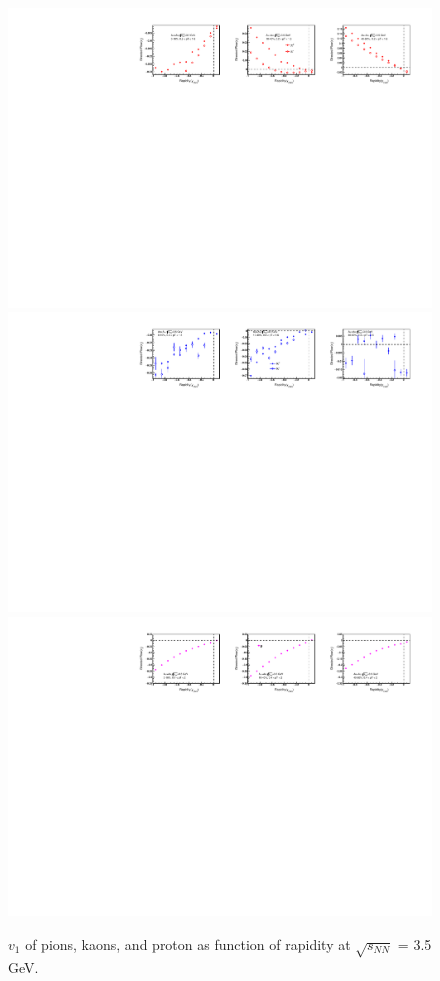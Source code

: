 \begin{figure}[hbt!]
\centering
\includegraphics[width=0.85\linewidth]{figures/chapter03/3p5gev_pion_v1VSy.pdf}
\includegraphics[width=0.85\linewidth]{figures/chapter03/3p5gev_kaon_v1VSy.pdf}
\includegraphics[width=0.85\linewidth]{figures/chapter03/3p5gev_proton_v1VSy.pdf}
\caption{$v_1$ of pions, kaons, and proton as function of rapidity at $\sqrt{s_{NN}}$ = 3.5 GeV.}
\label{fig:3p5gev_piKp_v1y}
\end{figure}

